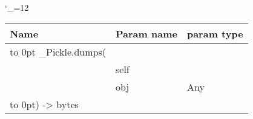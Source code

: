 \begingroup \catcode`\_=12 \tt
\begin{tabular}{lll}
\toprule
\textrm{Name}&\textrm{Param name}&\textrm{param type}\\
\midrule
\hbox to 0pt {_Pickle.dumps(\hss}\\
& self\\
& obj & Any\\
\hbox to 0pt{) -> bytes\hss}\\
\bottomrule
\end{tabular}
\endgroup
